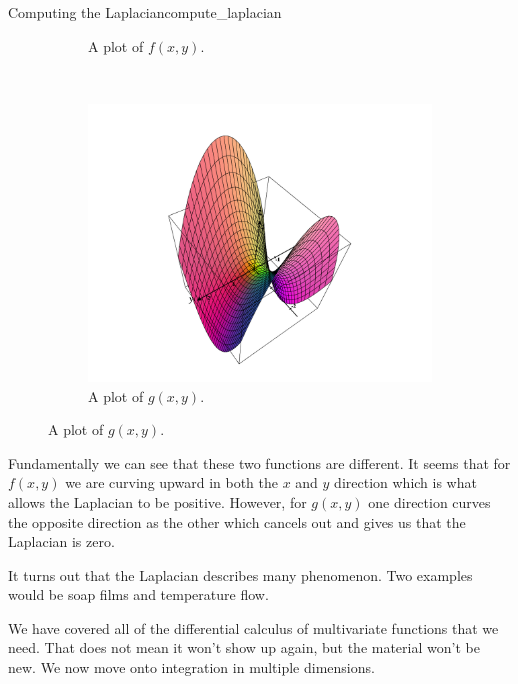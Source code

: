 \begin{ex}{Computing the Laplacian}{compute_laplacian}
\begin{figure}[H]
\begin{subfigure}[h]{.45\textwidth}
            \caption{A plot of $f(x,y).$}
            \end{subfigure}
            ~
            \begin{subfigure}[h]{.45\textwidth}
            \includegraphics[width=\textwidth]{Figures_Part_6/0_laplace.png}
            \caption{A plot of $g(x,y).$}
            \end{subfigure}
        \end{figure}
        Fundamentally we can see that these two functions are different.  It seems that for $f(x,y)$ we are curving upward in both the $x$ and $y$ direction which is what allows the Laplacian to be positive. However, for $g(x,y)$ one direction curves the opposite direction as the other which cancels out and gives us that the Laplacian is zero.  
        
        It turns out that the Laplacian describes many phenomenon. Two examples would be soap films and temperature flow.
        \end{ex}

        
        We have covered all of the differential calculus of multivariate functions that we need.  That does not mean it won't show up again, but the material won't be new.  We now move onto integration in multiple dimensions.
        
        
